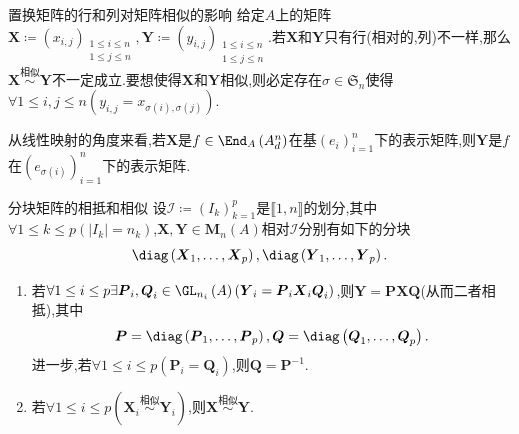 \begin{remark}{置换矩阵的行和列对矩阵相似的影响}{}
	给定$A$上的矩阵$\boldsymbol{X}\coloneq\left(x_{i,j}\right)_{\substack{1\leq i\leq n\\1\leq j\leq n}},\boldsymbol{Y}\coloneq\left(y_{i,j}\right)_{\substack{1\leq i\leq n\\1\leq j\leq n}}$.若$\boldsymbol{X}$和$\boldsymbol{Y}$只有行(相对的,列)不一样,那么$\boldsymbol{X}\overset{\text{相似}}{\sim}\boldsymbol{Y}$不一定成立.要想使得$\boldsymbol{X}$和$\boldsymbol{Y}$相似,则必定存在$\sigma\in\mathfrak{S}_{n}$使得$\forall 1\leq i,j\leq n\left(y_{i,j}=x_{\sigma\left(i\right),\sigma\left(j\right)}\right)$.
	
	从线性映射的角度来看,若$\boldsymbol{X}$是$f\in\End_{A}\left(A_{d}^{n}\right)$在基$\left(e_{i}\right)_{i=1}^{n}$下的表示矩阵,则$\boldsymbol{Y}$是$f$在$\left(e_{\sigma\left(i\right)}\right)_{i=1}^{n}$下的表示矩阵.
\end{remark}

\begin{remark}{分块矩阵的相抵和相似}{}
	设$\mathcal{I}\coloneq\left(I_{k}\right)_{k=1}^{p}$是$\llbracket 1,n\rrbracket$的划分,其中$\forall 1\leq k\leq p\left(\left|I_{k}\right|=n_{k}\right)$,$\boldsymbol{X},\boldsymbol{Y}\in\mathbf{M}_{n}\left(A\right)$相对$\mathcal{I}$分别有如下的分块
	\begin{align*}
		\diag\left(\boldsymbol{X}_{1},\ldots,\boldsymbol{X}_{p}\right),\diag\left(\boldsymbol{Y}_{1},\ldots,\boldsymbol{Y}_{p}\right).
	\end{align*}
	\begin{enumerate}
		\item 若$\forall 1\leq i\leq p\exists\boldsymbol{P}_{i},\boldsymbol{Q}_{i}\in\GL_{n_{i}}\left(A\right)\left(\boldsymbol{Y}_{i}=\boldsymbol{P}_{i}\boldsymbol{X}_{i}\boldsymbol{Q}_{i}\right)$,则$\boldsymbol{Y}=\boldsymbol{P}\boldsymbol{X}\boldsymbol{Q}$(从而二者相抵),其中
		\begin{align*}
			\boldsymbol{P}=\diag\left(\boldsymbol{P}_{1},\ldots,\boldsymbol{P}_{p}\right),\boldsymbol{Q}=\diag\left(\boldsymbol{Q}_{1},\ldots,\boldsymbol{Q}_{p}\right).
		\end{align*}
		进一步,若$\forall 1\leq i\leq p\left(\boldsymbol{P}_{i}=\boldsymbol{Q}_{i}\right)$,则$\boldsymbol{Q}=\boldsymbol{P}^{-1}$.
		\item 若$\forall 1\leq i\leq p\left(\boldsymbol{X}_{i}\overset{\text{相似}}{\sim}\boldsymbol{Y}_{i}\right)$,则$\boldsymbol{X}\overset{\text{相似}}{\sim}\boldsymbol{Y}$.
	\end{enumerate}
\end{remark}



